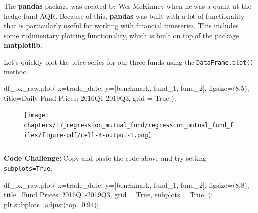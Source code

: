 \documentclass[
  letterpaper,
  DIV=11,
  numbers=noendperiod]{scrreprt}
\newenvironment{Shaded}{\begin{snugshade}}{\end{snugshade}}
\newcommand{\DecValTok}[1]{\textcolor[rgb]{0.68,0.00,0.00}{#1}}
\newcommand{\FloatTok}[1]{\textcolor[rgb]{0.68,0.00,0.00}{#1}}
\newcommand{\NormalTok}[1]{\textcolor[rgb]{0.00,0.23,0.31}{#1}}
\newcommand{\OperatorTok}[1]{\textcolor[rgb]{0.37,0.37,0.37}{#1}}
\newcommand{\StringTok}[1]{\textcolor[rgb]{0.13,0.47,0.30}{#1}}
\newcommand{\VariableTok}[1]{\textcolor[rgb]{0.07,0.07,0.07}{#1}}
\begin{document}
The \textbf{pandas} package was created by Wes McKinney when he was a
quant at the hedge fund AQR. Because of this, \textbf{pandas} was built
with a lot of functionality that is particularly useful for working with
financial timeseries. This includes some rudimentary plotting
functionality, which is built on top of the package \textbf{matplotlib}.

Let's quickly plot the price series for our three funds using the
\texttt{DataFrame.plot()} method.

\begin{Shaded}
\begin{Highlighting}[]
\NormalTok{df\_px\_raw.plot(}
\NormalTok{    x}\OperatorTok{=}\StringTok{\textquotesingle{}trade\_date\textquotesingle{}}\NormalTok{, }
\NormalTok{    y}\OperatorTok{=}\NormalTok{[}\StringTok{\textquotesingle{}benchmark\textquotesingle{}}\NormalTok{, }\StringTok{\textquotesingle{}fund\_1\textquotesingle{}}\NormalTok{, }\StringTok{\textquotesingle{}fund\_2\textquotesingle{}}\NormalTok{],}
\NormalTok{    figsize}\OperatorTok{=}\NormalTok{(}\DecValTok{8}\NormalTok{,}\DecValTok{5}\NormalTok{),}
\NormalTok{    title}\OperatorTok{=}\StringTok{\textquotesingle{}Daily Fund Prices: 2016Q1{-}2019Q3\textquotesingle{}}\NormalTok{,}
\NormalTok{    grid }\OperatorTok{=} \VariableTok{True}
\NormalTok{)}\OperatorTok{;}
\end{Highlighting}
\end{Shaded}

\begin{figure}[H]

{\centering \texttt{[image: chapters/17\_regression\_mutual\_fund/regression\_mutual\_fund\_files/figure-pdf/cell-4-output-1.png]}

}

\end{figure}

\begin{center}\rule{0.5\linewidth}{0.5pt}\end{center}

\textbf{Code Challenge:} Copy and paste the code above and try setting
\texttt{subplots=True}.

\begin{Shaded}
\begin{Highlighting}[]
\NormalTok{df\_px\_raw.plot(}
\NormalTok{    x}\OperatorTok{=}\StringTok{\textquotesingle{}trade\_date\textquotesingle{}}\NormalTok{, }
\NormalTok{    y}\OperatorTok{=}\NormalTok{[}\StringTok{\textquotesingle{}benchmark\textquotesingle{}}\NormalTok{, }\StringTok{\textquotesingle{}fund\_1\textquotesingle{}}\NormalTok{, }\StringTok{\textquotesingle{}fund\_2\textquotesingle{}}\NormalTok{],}
\NormalTok{    figsize}\OperatorTok{=}\NormalTok{(}\DecValTok{8}\NormalTok{,}\DecValTok{8}\NormalTok{),}
\NormalTok{    title}\OperatorTok{=}\StringTok{\textquotesingle{}Fund Prices: 2016Q1{-}2019Q3\textquotesingle{}}\NormalTok{,}
\NormalTok{    grid }\OperatorTok{=} \VariableTok{True}\NormalTok{,}
\NormalTok{    subplots }\OperatorTok{=} \VariableTok{True}\NormalTok{,}
\NormalTok{)}\OperatorTok{;}
\NormalTok{plt.subplots\_adjust(top}\OperatorTok{=}\FloatTok{0.94}\NormalTok{)}\OperatorTok{;}
\end{Highlighting}
\end{Shaded}
\end{document}
